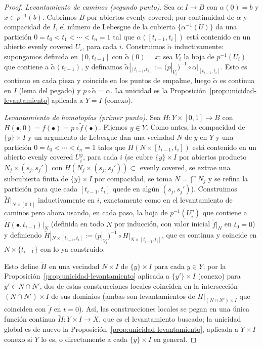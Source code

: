\documentclass[11pt,a4paper]{article}
\theoremstyle{plain}
\theoremstyle{definition}
\theoremstyle{remark}
\begin{document}
\begin{proof}
\emph{Levantamiento de caminos (segundo punto).} Sea $\alpha:I\to B$ con
$\alpha(0)=b$ y $x\in p^{-1}(b)$. Cubrimos $B$ por abiertos evenly
covered; por continuidad de $\alpha$ y compacidad de $I$, el número de
Lebesgue de la cubierta $\{\alpha^{-1}(U)\}$ da una partición
$0=t_0<t_1<\cdots<t_n=1$ tal que $\alpha([t_{i-1},t_i])$ está contenido en
un abierto evenly covered $U_i$, para cada $i$. Construimos $\tilde\alpha$
inductivamente: supongamos definida en $[0,t_{i-1}]$ con
$\tilde\alpha(0)=x$; sea $V_i$ la hoja de $p^{-1}(U_i)$ que contiene a
$\tilde\alpha(t_{i-1})$, y definamos
$\tilde\alpha|_{[t_{i-1},t_i]}:=(p|_{V_i})^{-1}\circ\alpha|_{[t_{i-1},t_i]}$.
Esto es continuo en cada pieza y coincide en los puntos de empalme, luego
$\tilde\alpha$ es continua en $I$ (lema del pegado) y $p\circ\tilde\alpha=\alpha$.
La unicidad es la Proposición~\ref{prop:unicidad-levantamiento} aplicada a
$Y=I$ (conexo).

\emph{Levantamiento de homotopías (primer punto).} Sea
$H:Y\times[0,1]\to B$ con $H(\bullet,0)=f(\bullet)=p\circ\tilde f(\bullet)$.
Fijemos $y\in Y$. Como antes, la compacidad de $\{y\}\times I$ y un
argumento de Lebesgue dan una vecindad $N$ de $y$ en $Y$ y una partición
$0=t_0<\cdots<t_n=1$ tales que $H(N\times[t_{i-1},t_i])$ está contenido en
un abierto evenly covered $U_i^y$, para cada $i$ (se cubre $\{y\}\times I$
por abiertos producto $N_j\times(s_j,s_j')$ con $H(N_j\times(s_j,s_j'))\subset$
evenly covered, se extrae una subcubierta finita de $\{y\}\times I$ por
compacidad, se toma $N=\bigcap N_j$ y se refina la partición para que cada
$[t_{i-1},t_i]$ quede en algún $(s_j,s_j')$). Construimos
$\tilde H|_{N\times[0,1]}$ inductivamente en $i$, exactamente como en el
levantamiento de caminos pero ahora usando, en cada paso, la hoja de
$p^{-1}(U_i^y)$ que contiene a $\tilde H(\bullet,t_{i-1})|_N$ (definida en
todo $N$ por inducción, con valor inicial $\tilde f|_N$ en $t_0=0$) y
definiendo $\tilde H|_{N\times[t_{i-1},t_i]}:=(p|_{V_i})^{-1}\circ H|_{N\times[t_{i-1},t_i]}$,
que es continua y coincide en $N\times\{t_{i-1}\}$ con lo ya construido.

Esto define $\tilde H$ en una vecindad $N\times I$ de $\{y\}\times I$ para
cada $y\in Y$; por la Proposición~\ref{prop:unicidad-levantamiento}
aplicada a $\{y'\}\times I$ (conexo) para $y'\in N\cap N'$, dos de estas
construcciones locales coinciden en la intersección $(N\cap N')\times I$
de sus dominios (ambas son levantamientos de $H|_{(N\cap N')\times I}$
que coinciden con $\tilde f$ en $t=0$). Así, las construcciones locales se
pegan en una única función continua $\tilde H:Y\times I\to X$, que es el
levantamiento buscado; la unicidad global es de nuevo la
Proposición~\ref{prop:unicidad-levantamiento}, aplicada a $Y\times I$
conexo si $Y$ lo es, o directamente a cada $\{y\}\times I$ en general.


\end{proof}
\end{document}
